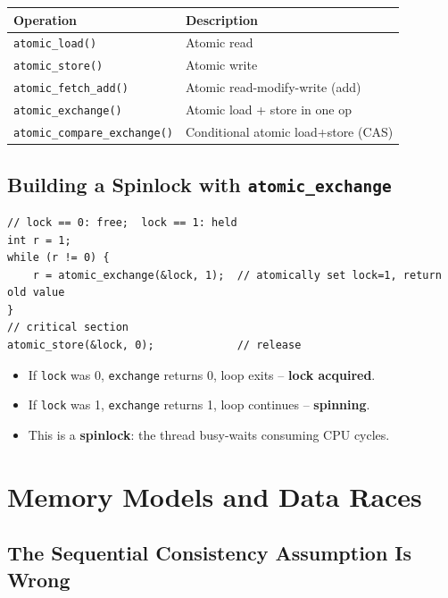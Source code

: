 \documentclass[11pt,a4paper]{article}
\newcommand{\term}[1]{\textbf{#1}}
\newcommand{\code}[1]{\texttt{#1}}
\begin{document}
\begin{center}
\begin{tabular}{ll}
  \toprule
  \textbf{Operation} & \textbf{Description} \\
  \midrule
  \code{atomic\_load()}            & Atomic read \\
  \code{atomic\_store()}           & Atomic write \\
  \code{atomic\_fetch\_add()}      & Atomic read-modify-write (add) \\
  \code{atomic\_exchange()}        & Atomic load + store in one op \\
  \code{atomic\_compare\_exchange()} & Conditional atomic load+store (CAS) \\
  \bottomrule
\end{tabular}
\end{center}

\subsection{Building a Spinlock with \texttt{atomic\_exchange}}

\begin{lstlisting}
// lock == 0: free;  lock == 1: held
int r = 1;
while (r != 0) {
    r = atomic_exchange(&lock, 1);  // atomically set lock=1, return old value
}
// critical section
atomic_store(&lock, 0);             // release
\end{lstlisting}

\begin{itemize}
  \item If \code{lock} was 0, \code{exchange} returns 0, loop exits --
        \textbf{lock acquired}.
  \item If \code{lock} was 1, \code{exchange} returns 1, loop continues --
        \textbf{spinning}.
  \item This is a \term{spinlock}: the thread busy-waits consuming CPU cycles.
\end{itemize}

\section{Memory Models and Data Races}

\subsection{The Sequential Consistency Assumption Is Wrong}
\end{document}
